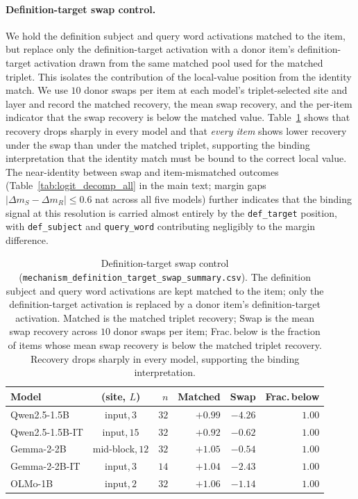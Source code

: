\documentclass[11pt]{article}
\begin{document}
\paragraph{Definition-target swap control.}
We hold the definition subject and query word activations matched to the item, but replace only
the definition-target activation with a donor item's definition-target activation drawn from
the same matched pool used for the matched triplet. This isolates the contribution of the
local-value position from the identity match. We use $10$ donor swaps per item at each model's
triplet-selected site and layer and record the matched recovery, the mean swap recovery, and the
per-item indicator that the swap recovery is below the matched value.
Table~\ref{tab:swap_summary} shows that recovery drops sharply in every model and that
\emph{every item} shows lower recovery under the swap than under the matched triplet,
supporting the binding interpretation that the identity match must be bound to the correct
local value. The near-identity between swap and item-mismatched outcomes (Table~\ref{tab:logit_decomp_all}
in the main text; margin gaps $|\Delta m_S - \Delta m_R| \leq 0.6$ nat across all five
models) further indicates that the binding signal at this resolution is carried almost
entirely by the \texttt{def\_target} position, with \texttt{def\_subject} and
\texttt{query\_word} contributing negligibly to the margin difference.

\begin{table}[H]
\centering
\scriptsize
\setlength{\tabcolsep}{2pt}
\begin{tabular*}{\columnwidth}{@{\extracolsep{\fill}}lcrrrr@{}}
\toprule
Model & (site, $L$) & $n$ & Matched & Swap & Frac.\,below \\
\midrule
Qwen2.5-1.5B    & input,$\,3$     & $32$ & $+0.99$ & $-4.26$ & $1.00$ \\
Qwen2.5-1.5B-IT & input,$\,15$    & $32$ & $+0.92$ & $-0.62$ & $1.00$ \\
Gemma-2-2B      & mid-block,$\,12$ & $32$ & $+1.05$ & $-0.54$ & $1.00$ \\
Gemma-2-2B-IT   & input,$\,3$     & $14$ & $+1.04$ & $-2.43$ & $1.00$ \\
OLMo-1B         & input,$\,2$     & $32$ & $+1.06$ & $-1.14$ & $1.00$ \\
\bottomrule
\end{tabular*}
\caption{Definition-target swap control
(\texttt{mechanism\_definition\_target\_swap\_\allowbreak summary.csv}). The definition subject
and query word activations are kept matched to the item; only the definition-target activation
is replaced by a donor item's definition-target activation. Matched is the matched
triplet recovery; Swap is the mean swap recovery across $10$ donor swaps per item;
Frac.\,below is the fraction of items whose mean swap recovery is below the matched
triplet recovery. Recovery drops sharply in every model, supporting the binding
interpretation.}
\label{tab:swap_summary}
\end{table}
\end{document}

